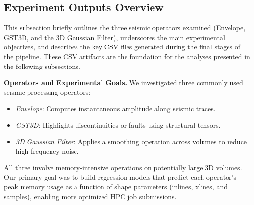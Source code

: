 \subsection{Experiment Outputs Overview}
\label{subsec:pmc-results-experiment-outputs-overview}

This subsection briefly outlines the three seismic operators examined (Envelope, \ac{GST3D}, and the 3D Gaussian Filter), underscores the main experimental objectives, and describes the key \ac{CSV} files generated during the final stages of the pipeline.
These \ac{CSV} artifacts are the foundation for the analyses presented in the following subsections.

\vspace{1em}
\noindent
\textbf{Operators and Experimental Goals.}
We investigated three commonly used seismic processing operators:
\begin{itemize}
    \item \emph{Envelope}: Computes instantaneous amplitude along seismic traces.
    \item \emph{\ac{GST3D}}: Highlights discontinuities or faults using structural tensors.
    \item \emph{3D Gaussian Filter}: Applies a smoothing operation across volumes to reduce high-frequency noise.
\end{itemize}
All three involve memory-intensive operations on potentially large \ac{3D} volumes.
Our primary goal was to build regression models that predict each operator's peak memory usage as a function of shape parameters (inlines, xlines, and samples), enabling more optimized \ac{HPC} job submissions.

